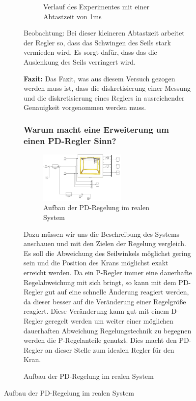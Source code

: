 \documentclass[10pt]{scrartcl}
\begin{document}
\begin{figure}[H]
\begin{figure}
\begin{enumerate}
\begin{figure}[H]
	\caption{Verlauf des Experimentes mit einer Abtastzeit von 1ms}
	\label{img:grafik-dummy}
\end{figure}
Beobachtung: 
Bei dieser kleineren Abtastzeit arbeitet der Regler so, dass das Schwingen des Seils stark vermieden wird. Es sorgt dafür, dass das die Auslenkung des Seils verringert wird.
\end{enumerate}
\textbf { Fazit:} Das Fazit, was aus diesem Versuch gezogen werden muss ist, dass die diskretisierung einer Messung und die diskretisierung eines Reglers in ausreichender Genauigkeit vorgenommen werden muss.
\subsubsection{Warum macht eine Erweiterung um einen PD-Regler Sinn?}
\begin{figure}[H]
	\centering
	\includegraphics[width=0.6\textwidth]{PDRegler.png}
	\caption{Aufbau der PD-Regelung im realen System}
	\label{img:grafik-dummy}
\end{figure}
Dazu müssen wir uns die Beschreibung des Systems anschauen und mit den Zielen der Regelung vergleich. Es soll die Abweichung des Seilwinkels möglichst gering sein und die Position des Krans möglichst exakt erreicht werden. Da ein P-Regler immer eine dauerhafte Regelabweichung mit sich bringt, so kann mit dem PD-Regler gut auf eine schnelle Änderung reagiert werden, da dieser besser auf die Veränderung einer Regelgröße reagiert. Diese Veränderung kann gut mit einem D-Regler geregelt werden um weiter einer möglichen dauerhaften Abweichung Regelungstechnik zu begegnen werden die P-Regelanteile genutzt. Dies macht den PD-Regler an dieser Stelle zum idealen Regler für den Kran.


\end{figure}
\end{figure}
\end{document}
